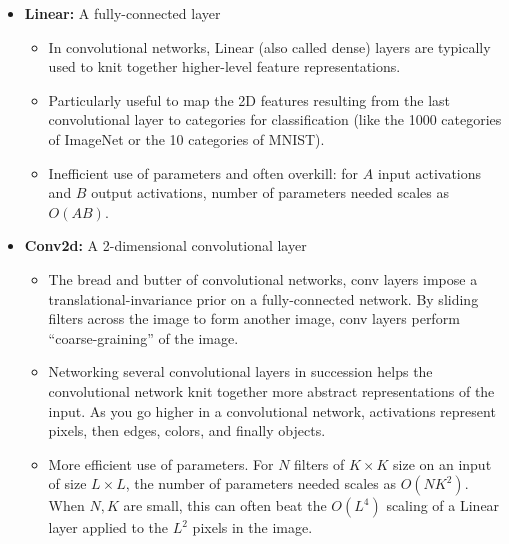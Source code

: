  \begin{itemize}
  \item \textbf{Linear:} A fully-connected layer
  \begin{itemize}
    \item In convolutional networks, Linear (also called dense) layers are typically used to knit together higher-level feature representations.
    \item Particularly useful to map the 2D features resulting from the last convolutional layer to categories for classification (like the 1000 categories of ImageNet or the 10 categories of MNIST).
    \item Inefficient use of parameters and often overkill: for $A$ input activations and $B$ output activations, number of parameters needed scales as $O(AB)$.
  \end{itemize}
  \item \textbf{Conv2d:} A 2-dimensional convolutional layer
  \begin{itemize}
    \item The bread and butter of convolutional networks, conv layers impose a translational-invariance prior on a fully-connected network. By sliding filters across the image to form another image, conv layers perform ``coarse-graining'' of the image.
    \item Networking several convolutional layers in succession helps the convolutional network knit together more abstract representations of the input. As you go higher in a convolutional network, activations represent pixels, then edges, colors, and finally objects.
    \item More efficient use of parameters. For $N$ filters of $K \times K$ size on an input of size $L \times L$, the number of parameters needed scales as $O(N K^2)$. When $N, K$ are small, this can often beat the $O(L^4)$ scaling of a Linear layer applied to the $L^2$ pixels in the image.


\end{itemize}
\end{itemize}
